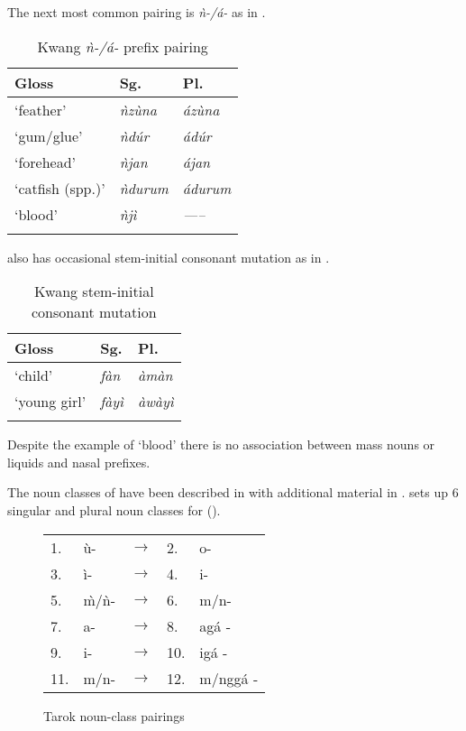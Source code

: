 \documentclass[output=paper]{langsci/langscibook}
\begin{document}
The next most common pairing is \textit{ǹ-/á-} as in .

\begin{table}
\caption{Kwang \textit{ǹ-/á-}  prefix pairing} 
\label{extab:nomaffplat:59}
\begin{tabularx}{.75\textwidth}{XXl}
\lsptoprule
Gloss 	& Sg.  	& Pl. \\
\midrule
‘feather’ 	& \itshape ǹzùna 	& \itshape ázùna\\
‘gum/glue’ 	& \itshape ǹdúr 	& \itshape ádúr\\
‘forehead’ 	& \itshape ǹjan 	& \itshape ájan\\
‘catfish (spp.)’ 	& \itshape ǹdurum 	& \itshape ádurum\\
‘blood’ 	& \itshape ǹjì 	& \itshape —–\\
 \lspbottomrule
\end{tabularx}
\end{table}



 also has occasional stem-initial consonant mutation as in .

\begin{table}
\caption{Kwang stem-initial consonant mutation}
\label{extab:nomaffplat:60}
\begin{tabularx}{.75\textwidth}{XXl}
\lsptoprule
Gloss 	& Sg.  	& Pl. \\
\midrule
‘child’ 	& \itshape fàn 	& \itshape àmàn\\
‘young girl’ 	& \itshape fàyì 	& \itshape àwàyì\\
 \lspbottomrule
\end{tabularx}
\end{table}



Despite the example of ‘blood’ there is no association between mass nouns or liquids and nasal prefixes.

The noun classes of  have been described in \citet{Sibomana1981} with additional material in \citet{Longtau2008}. \citet{Sibomana1981} sets up 6 singular and plural noun classes for  ().

\begin{figure}
\caption{\label{figtab:nomaffplat:22} Tarok noun-class pairings}
\begin{tabular}{lllll}
1. 	& ù- 	& $\to$ 	& 2. 	& o- \\
3. 	& ì- 	& $\to$ 	& 4. 	&i- \\
5. 	& m̀/ǹ- 	& $\to$ 	& 6. 	& m/n- \\
7. 	& a- 	& $\to$ 	& 8. 	& agá - \\
9. 	& i- 	& $\to$ 	& 10. 	& igá - \\
11.	& m/n- 	& $\to$ 	& 12. 	& m/nggá - \\
\end{tabular}  
\end{figure}
 
\end{document}
